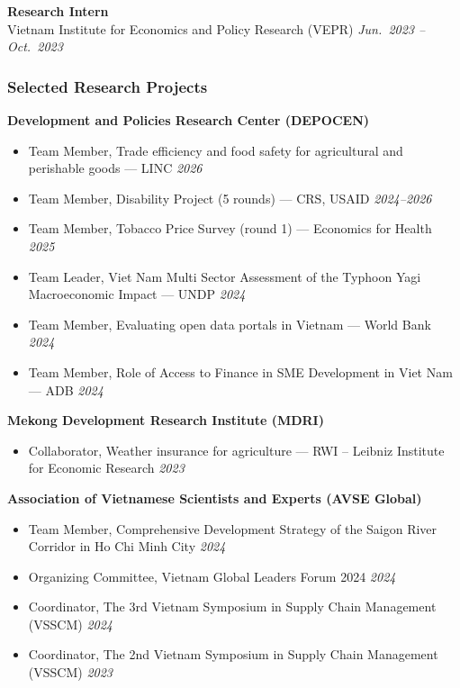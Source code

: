 \documentclass[10.5pt]{article}
\begin{document}
\textbf{Research Intern} \hfill \\
Vietnam Institute for Economics and Policy Research (VEPR) \hfill \emph{Jun.\ 2023 -- Oct.\ 2023}

\subsubsection{Selected Research Projects}
\textbf{Development and Policies Research Center (DEPOCEN)}
\begin{itemize}
\item Team Member, Trade efficiency and food safety for agricultural and perishable goods --- LINC \hfill \emph{2026}
\item Team Member, Disability Project (5 rounds) --- CRS, USAID \hfill \emph{2024--2026}
\item Team Member, Tobacco Price Survey (round 1) --- Economics for Health \hfill \emph{2025}
\item Team Leader, Viet Nam Multi Sector Assessment of the Typhoon Yagi Macroeconomic Impact --- UNDP \hfill \emph{2024}
\item Team Member, Evaluating open data portals in Vietnam --- World Bank \hfill \emph{2024}
\item Team Member, Role of Access to Finance in SME Development in Viet Nam --- ADB \hfill \emph{2024}
\end{itemize}

\textbf{Mekong Development Research Institute (MDRI)}
\begin{itemize}
\item Collaborator, Weather insurance for agriculture --- RWI -- Leibniz Institute for Economic Research \hfill \emph{2023}
\end{itemize}

\textbf{Association of Vietnamese Scientists and Experts (AVSE Global)}
\begin{itemize}
\item Team Member, Comprehensive Development Strategy of the Saigon River Corridor in Ho Chi Minh City \hfill \emph{2024}
\item Organizing Committee, Vietnam Global Leaders Forum 2024 \hfill \emph{2024}
\item Coordinator, The 3rd Vietnam Symposium in Supply Chain Management (VSSCM) \hfill \emph{2024}
\item Coordinator, The 2nd Vietnam Symposium in Supply Chain Management (VSSCM) \hfill \emph{2023}
\end{itemize}
\end{document}
